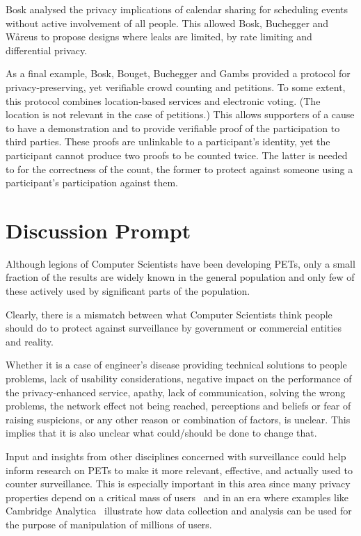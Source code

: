 Bosk analysed the privacy implications of calendar sharing for scheduling 
events without active involvement of all people.
This allowed Bosk, Buchegger and Wåreus to propose designs where leaks are 
limited, \eg by rate limiting and differential privacy.

As a final example, Bosk, Bouget, Buchegger and Gambs provided a protocol for 
privacy-preserving, yet verifiable crowd counting and petitions.
To some extent, this protocol combines location-based services and electronic 
voting.
(The location is not relevant in the case of petitions.)
This allows supporters of a cause to have a demonstration and to provide 
verifiable proof of the participation to third parties.
These proofs are unlinkable to a participant's identity, yet the participant 
cannot produce two proofs to be counted twice.
The latter is needed to for the correctness of the count, the former to protect 
against someone using a participant's participation against them.

\section{Discussion Prompt}
Although legions of Computer Scientists have been developing
\acp{PET}, only a small fraction of the results are widely known in
the general population and only few of these actively used by
significant parts of the population. 

Clearly, there is a mismatch between what Computer Scientists think
people should do to protect against surveillance by government or
commercial entities and reality.

Whether it is a case of engineer's disease providing technical
solutions to people problems, lack of usability considerations,
negative impact on the performance of the privacy-enhanced service,
apathy, lack of communication, solving the wrong problems, the network
effect not being reached, perceptions and beliefs or fear of raising
suspicions, or any other reason or combination of factors, is
unclear. This implies that it is also unclear what could/should be
done to change that.

Input and insights from other disciplines concerned with surveillance
could help inform research on \acp{PET} to make it more relevant,
effective, and actually used to counter surveillance. This is
especially important in this area since many privacy properties depend
on a critical mass of users~\cite{AnonymityLovesCompany} and in an era
where examples like Cambridge 
Analytica~\cite{%
  cambridge-analytica-wired,
  cambridge-analytica-guardian,
  cambridge-analytica-nytimes,
  cambridge-analytica-wp%
} illustrate how data collection and analysis can be used for the
purpose of manipulation of millions of users. 



